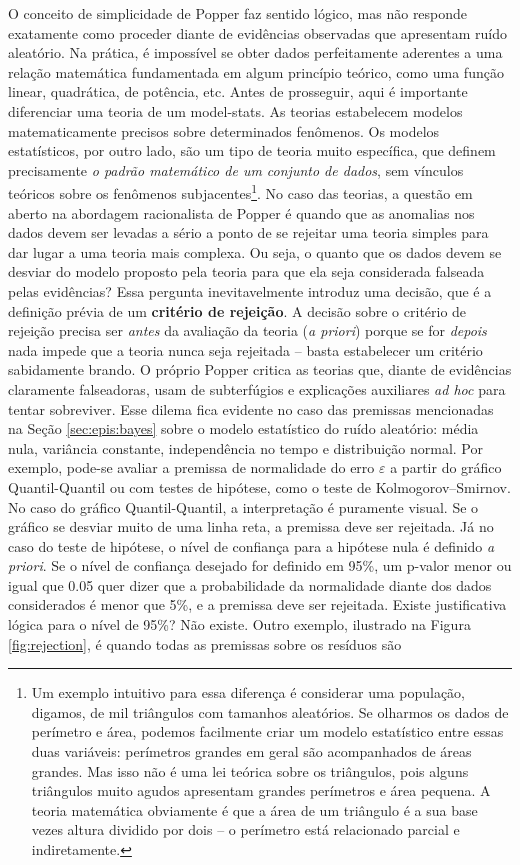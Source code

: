 \documentclass[./main.tex]{subfiles}
\begin{document}
\par O conceito de simplicidade de Popper faz sentido lógico, mas não responde exatamente como proceder diante de evidências observadas que apresentam ruído aleatório. Na prática, é impossível se obter dados perfeitamente aderentes a uma relação matemática fundamentada em algum princípio teórico, como uma função linear, quadrática, de potência, etc. Antes de prosseguir, aqui é importante diferenciar uma  teoria de um \gls{model-stats}. As teorias estabelecem modelos matematicamente precisos sobre determinados fenômenos. Os modelos estatísticos, por outro lado, são um tipo de teoria muito específica, que definem precisamente \textit{o padrão matemático de um conjunto de dados}, sem vínculos teóricos sobre os fenômenos subjacentes\footnote{Um exemplo intuitivo para essa diferença é considerar uma população, digamos, de mil triângulos com tamanhos aleatórios. Se olharmos os dados de perímetro e área, podemos facilmente criar um modelo estatístico entre essas duas variáveis: perímetros grandes em geral são acompanhados de áreas grandes. Mas isso não é uma lei teórica sobre os triângulos, pois alguns triângulos muito agudos apresentam grandes perímetros e área pequena. A teoria matemática obviamente é que a área de um triângulo é a sua base vezes altura dividido por dois -- o perímetro está relacionado parcial e indiretamente.}. No caso das teorias, a questão em aberto na abordagem racionalista de Popper é quando que as anomalias nos dados devem ser levadas a sério a ponto de se rejeitar uma teoria simples para dar lugar a uma teoria mais complexa. Ou seja, o quanto que os dados devem se desviar do modelo proposto pela teoria para que ela seja considerada falseada pelas evidências? Essa pergunta inevitavelmente introduz uma decisão, que é a definição prévia de um \textbf{critério de rejeição}. A decisão sobre o critério de rejeição precisa ser \textit{antes} da avaliação da teoria (\textit{a priori}) porque se for \textit{depois} nada impede que a teoria nunca seja rejeitada -- basta estabelecer um critério sabidamente brando. O próprio Popper critica as teorias que, diante de evidências claramente falseadoras, usam de subterfúgios e explicações auxiliares \textit{ad hoc} para tentar sobreviver. Esse dilema fica evidente no caso das premissas mencionadas na Seção \ref{sec:epis:bayes} sobre o modelo estatístico do ruído aleatório: média nula, variância constante, independência no tempo e distribuição normal. Por exemplo, pode-se avaliar a premissa de normalidade do erro $\varepsilon$ a partir do gráfico Quantil-Quantil ou com testes de hipótese, como o teste de Kolmogorov–Smirnov. No caso do gráfico Quantil-Quantil, a interpretação é puramente visual. Se o gráfico se desviar muito de uma linha reta, a premissa deve ser rejeitada. Já no caso do teste de hipótese, o nível de confiança para a hipótese nula é definido \textit{a priori}. Se o nível de confiança desejado for definido em 95\%, um p-valor menor ou igual que 0.05 quer dizer que a probabilidade da normalidade diante dos dados considerados é menor que 5\%, e a premissa deve ser rejeitada. Existe justificativa lógica para o nível de 95\%? Não existe. Outro exemplo, ilustrado na Figura \ref{fig:rejection}, é quando todas as premissas sobre os resíduos são 
\end{document}
